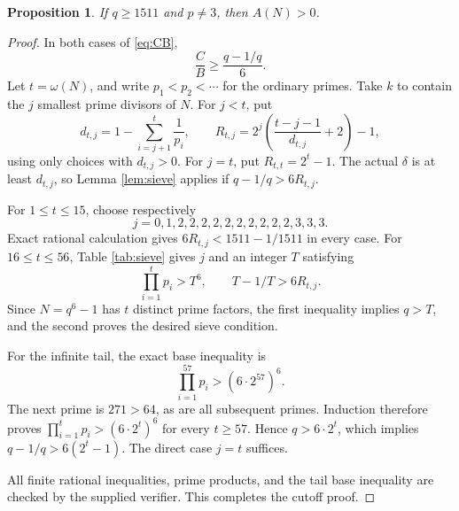 \documentclass[11pt]{article}
\newtheorem{proposition}[theorem]{Proposition}
\theoremstyle{remark}\newtheorem{remark}[theorem]{Remark}
\begin{document}
\begin{proposition}\label{prop:cutoff}
If $q\ge1511$ and $p\ne3$, then $A(N)>0$.
\end{proposition}
\begin{proof}
In both cases of \eqref{eq:CB},
\begin{equation}\label{eq:uniform}
 \frac CB\ge\frac{q-1/q}{6}.
\end{equation}
Let $t=\omega(N)$, and write $p_1<p_2<\cdots$ for the ordinary primes. Take $k$ to contain the $j$ smallest prime divisors of $N$. For $j<t$, put
\[
 d_{t,j}=1-\sum_{i=j+1}^t\frac1{p_i},\qquad
 R_{t,j}=2^j\left(\frac{t-j-1}{d_{t,j}}+2\right)-1,
\]
using only choices with $d_{t,j}>0$. For $j=t$, put $R_{t,t}=2^t-1$. The actual $\delta$ is at least $d_{t,j}$, so Lemma \ref{lem:sieve} applies if $q-1/q>6R_{t,j}$.

For $1\le t\le15$, choose respectively
\[
 j=0,1,2,2,2,2,2,2,2,2,2,2,3,3,3.
\]
Exact rational calculation gives $6R_{t,j}<1511-1/1511$ in every case. For $16\le t\le56$, Table \ref{tab:sieve} gives $j$ and an integer $T$ satisfying
\begin{equation}\label{eq:finitecert}
 \prod_{i=1}^t p_i>T^6,\qquad T-1/T>6R_{t,j}.
\end{equation}
Since $N=q^6-1$ has $t$ distinct prime factors, the first inequality implies $q>T$, and the second proves the desired sieve condition.

For the infinite tail, the exact base inequality is
\[
 \prod_{i=1}^{57}p_i>(6\cdot2^{57})^6.
\]
The next prime is $271>64$, as are all subsequent primes. Induction therefore proves $\prod_{i=1}^t p_i>(6\cdot2^t)^6$ for every $t\ge57$. Hence $q>6\cdot2^t$, which implies $q-1/q>6(2^t-1)$. The direct case $j=t$ suffices.

All finite rational inequalities, prime products, and the tail base inequality are checked by the supplied verifier. This completes the cutoff proof.
\end{proof}
\end{document}
